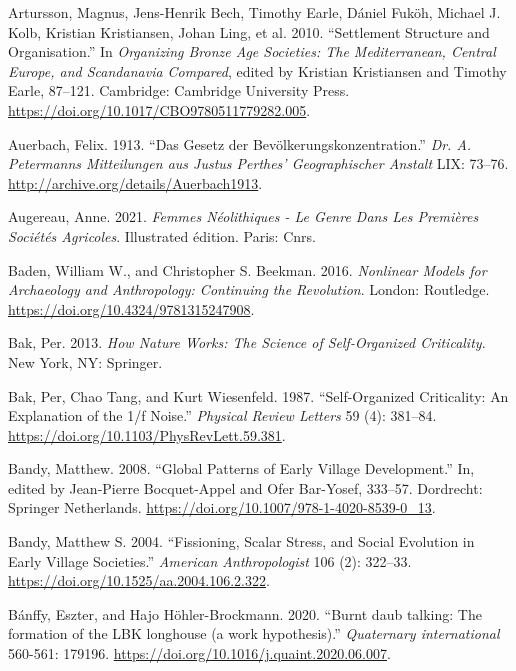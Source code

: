 \documentclass[
  12pt,
  a4paper, twoside]{book}
\newlength{\cslhangindent}
\newlength{\cslentryspacingunit} %
\newenvironment{CSLReferences}[2] %
 {%
  \setlength{\parindent}{0pt}
  \ifodd #1
  \let\oldpar\par
  \def\par{\hangindent=\cslhangindent\oldpar}
  \fi
  \setlength{\parskip}{#2\cslentryspacingunit}
 }%
 {}
\begin{document}
\begin{CSLReferences}{1}{0}
\leavevmode{}%
Artursson, Magnus, Jens-Henrik Bech, Timothy Earle, Dániel Fuköh, Michael J. Kolb, Kristian Kristiansen, Johan Ling, et al. 2010. {``Settlement {Structure} and {Organisation}.''} In \emph{Organizing {Bronze Age Societies}: {The Mediterranean}, {Central Europe}, and {Scandanavia Compared}}, edited by Kristian Kristiansen and Timothy Earle, 87--121. {Cambridge}: {Cambridge University Press}. \url{https://doi.org/10.1017/CBO9780511779282.005}.

\leavevmode{}%
Auerbach, Felix. 1913. {``Das Gesetz der Bevölkerungskonzentration.''} \emph{Dr. A. Petermanns Mitteilungen aus Justus Perthes' Geographischer Anstalt} LIX: 73--76. \url{http://archive.org/details/Auerbach1913}.

\leavevmode{}%
Augereau, Anne. 2021. \emph{Femmes Néolithiques - Le Genre Dans Les Premières Sociétés Agricoles}. Illustrated édition. Paris: Cnrs.

\leavevmode{}%
Baden, William W., and Christopher S. Beekman. 2016. \emph{Nonlinear Models for Archaeology and Anthropology: Continuing the Revolution}. London: Routledge. \url{https://doi.org/10.4324/9781315247908}.

\leavevmode{}%
Bak, Per. 2013. \emph{How {Nature Works}: {The Science} of {Self-Organized Criticality}}. {New York, NY}: {Springer}.

\leavevmode{}%
Bak, Per, Chao Tang, and Kurt Wiesenfeld. 1987. {``Self-Organized Criticality: {An} Explanation of the 1/f Noise.''} \emph{Physical Review Letters} 59 (4): 381--84. \url{https://doi.org/10.1103/PhysRevLett.59.381}.

\leavevmode{}%
Bandy, Matthew. 2008. {``Global Patterns of Early Village Development.''} In, edited by Jean-Pierre Bocquet-Appel and Ofer Bar-Yosef, 333--57. Dordrecht: Springer Netherlands. \url{https://doi.org/10.1007/978-1-4020-8539-0_13}.

\leavevmode{}%
Bandy, Matthew S. 2004. {``Fissioning, Scalar Stress, and Social Evolution in Early Village Societies.''} \emph{American Anthropologist} 106 (2): 322--33. \url{https://doi.org/10.1525/aa.2004.106.2.322}.

\leavevmode{}%
Bánffy, Eszter, and Hajo Höhler-Brockmann. 2020. {``Burnt daub talking: The formation of the LBK longhouse (a work hypothesis).''} \emph{Quaternary international} 560-561: 179196. \url{https://doi.org/10.1016/j.quaint.2020.06.007}.


\end{CSLReferences}
\end{document}
